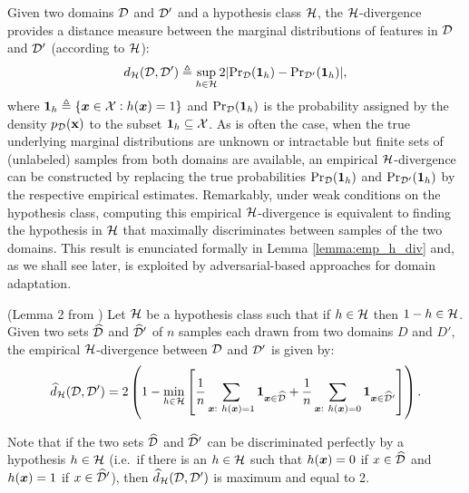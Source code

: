 Given two domains ${\mathcal{D}}$ and ${\mathcal{D}}'$ and a hypothesis class ${\mathcal{H}}$, the ${\mathcal{H}}$-divergence provides a distance measure between the marginal distributions of features in ${\mathcal{D}}$ and ${\mathcal{D}}'$ (according to ${\mathcal{H}}$):
\begin{equation*}
	\label{eq:h_div}
	d_{{\mathcal{H}}}({\mathcal{D}},{\mathcal{D}}') \triangleq \sup_{h \in {\mathcal{H}}} 2 |\mathrm{Pr}_{{\mathcal{D}}}(\bm{1}_h) - \mathrm{Pr}_{{\mathcal{D}}'}(\bm{1}_h)|,
\end{equation*}
where $\bm{1}_h \triangleq \{{\bm{x}} \in {\mathcal{X}}: h({\bm{x}})=1\}$ and $\mathrm{Pr}_{{\mathcal{D}}}(\bm{1}_h)$ is the probability assigned by the density $p_{\mathcal{D}}({\mathbf{x}})$ to the subset $\bm{1}_h \subseteq {\mathcal{X}}$. As is often the case, when the true underlying marginal distributions are unknown or intractable but finite sets of (unlabeled) samples from both domains are available, an empirical ${\mathcal{H}}$-divergence can be constructed by replacing the true probabilities $\mathrm{Pr}_{{\mathcal{D}}}(\bm{1}_h)$ and $\mathrm{Pr}_{{\mathcal{D}}'}(\bm{1}_h)$ by the respective empirical estimates. Remarkably, under weak conditions on the hypothesis class, computing this empirical ${\mathcal{H}}$-divergence is equivalent to finding the hypothesis in ${\mathcal{H}}$ that maximally discriminates between samples of the two domains. This result is enunciated formally in Lemma \ref{lemma:emp_h_div} and, as we shall see later, is exploited by adversarial-based approaches for domain adaptation.
\begin{lemma}
	\label{lemma:emp_h_div}
	(Lemma 2 from \citet{BenDavid2010}) Let ${\mathcal{H}}$ be a hypothesis class such that if $h \in {\mathcal{H}}$ then $1-h \in {\mathcal{H}}$. Given two sets $\widehat{{\mathcal{D}}}$ and $\widehat{{\mathcal{D}}}'$ of $n$ samples each drawn from two domains $D$ and $D'$, the empirical ${\mathcal{H}}$-divergence between ${\mathcal{D}}$ and ${\mathcal{D}}'$ is given by:
	\begin{equation}
		\widehat{d}_{{\mathcal{H}}}({\mathcal{D}},{\mathcal{D}}') = 2 \left(1 - \min_{h \in {\mathcal{H}}} \left[\frac{1}{n} \sum_{{\bm{x}}:~h({\bm{x}})=1} \bm{1}_{{\bm{x}} \in \widehat{{\mathcal{D}}}} + \frac{1}{n} \sum_{{\bm{x}}:~h({\bm{x}})=0} \bm{1}_{{\bm{x}} \in \widehat{{\mathcal{D}}}'}\right]\right).
	\end{equation}
\end{lemma}
Note that if the two sets $\widehat{{\mathcal{D}}}$ and $\widehat{{\mathcal{D}}}'$ can be discriminated perfectly by a hypothesis $h \in {\mathcal{H}}$ (i.e.\ if there is an $h \in {\mathcal{H}}$ such that $h({\bm{x}}) = 0$ if $x \in \widehat{{\mathcal{D}}}$ and $h({\bm{x}}) = 1$ if $x \in \widehat{{\mathcal{D}}}'$), then $\widehat{d}_{{\mathcal{H}}}({\mathcal{D}},{\mathcal{D}}')$ is maximum and equal to 2.

